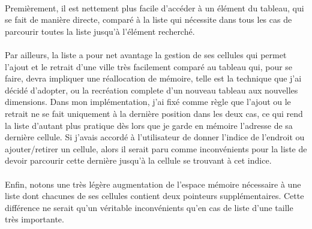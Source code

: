 \documentclass[a4paper, 11pt, oneside]{article}
\begin{document}
\paragraph{} Premièrement, il est nettement plus facile d'accéder à un élément du tableau, qui se fait 
de manière directe, comparé à la liste qui nécessite dans tous les cas de parcourir toutes la liste 
jusqu'à l'élément recherché.

\paragraph{} Par ailleurs, la liste a pour net avantage la gestion de ses cellules qui permet l'ajout et le retrait 
d'une ville très facilement comparé au tableau qui, pour se faire, devra impliquer une réallocation de mémoire, 
telle est la technique que j'ai décidé d'adopter, ou la recréation complete d'un nouveau tableau aux nouvelles dimensions. 
Dans mon implémentation, j'ai fixé comme règle que l'ajout ou le retrait ne se fait uniquement à la dernière position 
dans les deux cas, ce qui rend la liste d'autant plus pratique dès lors que je garde en mémoire l'adresse de sa 
dernière cellule. Si j'avais accordé à l'utilisateur de donner l'indice de l'endroit ou ajouter/retirer un cellule, 
alors il serait paru comme inconvénients pour la liste de devoir parcourir cette dernière jusqu'à la cellule se trouvant à cet indice.

\paragraph{} Enfin, notons une très légère augmentation de l'espace mémoire nécessaire à une liste dont chacunes 
de ses cellules contient deux pointeurs supplémentaires. Cette différence ne serait qu'un véritable inconvénients qu'en cas 
de liste d'une taille très importante.
\end{document}
